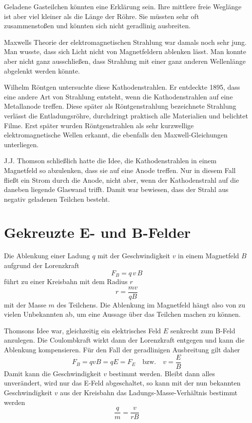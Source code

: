 Geladene Gasteilchen könnten eine Erklärung sein. Ihre mittlere freie Weglänge ist aber viel kleiner als die Länge der Röhre. Sie müssten sehr oft zusammenstoßen und könnten sich nicht geradlinig ausbreiten.

Maxwells Theorie der elektromagnetischen Strahlung war damals noch sehr jung. Man wusste, dass sich Licht nicht von Magnetfeldern ablenken lässt. Man konnte aber nicht ganz ausschließen, dass Strahlung mit einer ganz anderen Wellenlänge abgelenkt werden könnte.

Wilhelm Röntgen untersuchte diese Kathodenstrahlen. Er entdeckte 1895, dass eine andere Art von Strahlung entsteht, wenn die Kathodenstrahlen auf eine Metallanode treffen. Diese später als Röntgenstrahlung bezeichnete Strahlung verlässt die Entladungsröhre, durchdringt praktisch alle Materialien und belichtet Filme. Erst später wurden Röntgenstrahlen als sehr kurzwellige elektromagnetische Wellen erkannt, die ebenfalls den Maxwell-Gleichungen unterliegen.

J.J. Thomson schließlich hatte die Idee, die Kathodenstrahlen in einem Magnetfeld so abzulenken, dass sie auf eine Anode treffen. Nur in diesem Fall fließt ein Strom durch die Anode, nicht aber, wenn der Kathodenstrahl auf die daneben liegende Glaswand trifft. Damit war bewiesen, dass der Strahl aus negativ geladenen Teilchen besteht.

\section{Gekreuzte E- und B-Felder}

Die Ablenkung einer Ladung $q$ mit der Geschwindigkeit $v$ in einem Magnetfeld $B$ aufgrund der Lorenzkraft
\begin{equation}
    F_B = q \, v \, B
\end{equation}
führt zu einer Kreisbahn mit dem Radius $r$
\begin{equation}
    r = \frac{m v}{q B}
\end{equation}
mit der Masse $m$ des Teilchens. Die Ablenkung im Magnetfeld hängt also von zu vielen Unbekannten ab, um eine Aussage über das Teilchen machen zu können.

Thomsons Idee war, gleichzeitig ein elektrisches Feld $E$ senkrecht zum B-Feld anzulegen. Die Coulombkraft wirkt dann der Lorenzkraft entgegen und kann die Ablenkung kompensieren. Für den Fall der geradlinigen Ausbreitung gilt daher
\begin{equation}
    F_B = q v B = q E = F_E  \quad \text{bzw.} \quad v = \frac{E}{B} 
\end{equation}
Damit kann die Geschwindigkeit $v$ bestimmt werden. Bleibt dann alles unverändert, wird nur das E-Feld abgeschaltet, so kann mit der nun bekannten Geschwindigkeit $v$ aus der Kreisbahn das Ladungs-Masse-Verhältnis bestimmt werden
\begin{equation}
    \frac{q}{m} = \frac{v}{r B}
\end{equation}

